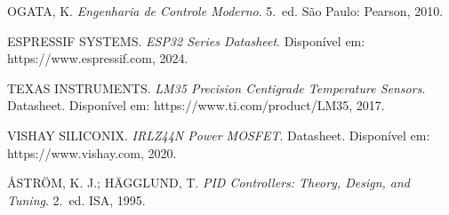 
{\small
\begin{enumerate}[label={[\arabic*]}, leftmargin=2.2em, itemsep=0.4ex]
  \item OGATA, K. \emph{Engenharia de Controle Moderno}. 5.\ ed. São Paulo: Pearson, 2010.
  \item ESPRESSIF SYSTEMS. \emph{ESP32 Series Datasheet}. Disponível em:
        https://www.espressif.com, 2024.
  \item TEXAS INSTRUMENTS. \emph{LM35 Precision Centigrade Temperature Sensors}. Datasheet.
        Disponível em: https://www.ti.com/product/LM35, 2017.
  \item VISHAY SILICONIX. \emph{IRLZ44N Power MOSFET}. Datasheet. Disponível em:
        https://www.vishay.com, 2020.
  \item ÅSTRÖM, K. J.; HÄGGLUND, T. \emph{PID Controllers: Theory, Design, and Tuning}.
        2.\ ed. ISA, 1995.
\end{enumerate}
}
